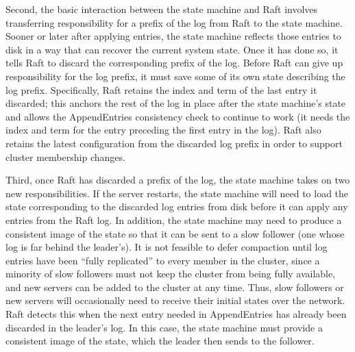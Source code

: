 Second, the basic interaction between the state machine and Raft
involves transferring responsibility for a prefix of the log from Raft
to the state machine.
Sooner or later after applying entries, the state machine reflects those
entries to disk in a way that can recover the current system state.
Once it has done so, it tells Raft to discard the corresponding
prefix of the log. 
Before Raft can give up responsibility for the log prefix,
it must save some of its own state describing the log prefix.
Specifically, Raft retains the index and term of the last entry it
discarded; this anchors the rest of the log in place after the state
machine's state and allows the AppendEntries consistency check to
continue to work (it needs the index and term for the entry preceding
the first entry in the log). Raft also retains the latest configuration
from the discarded log prefix in order to support cluster membership
changes.

Third, once Raft has discarded a prefix of the log, the state machine
takes on two new responsibilities. If the server restarts, the state
machine will need to load the state corresponding to the discarded log
entries from disk before it can apply any entries from the Raft log.
In addition, the state machine may need to produce a consistent image of
the state so that it can be sent to a slow follower
(one whose log is far behind the leader's). It is not feasible
to defer compaction  until log entries have been ``fully replicated'' to
every member in the cluster, since a minority of slow followers must not
keep the cluster from being fully available, and new servers can be
added to the cluster at any time. Thus, slow followers or new servers
will occasionally need to receive their initial states over the network.
Raft detects this when the next entry needed in AppendEntries has
already been discarded in the leader's log. In this case, the state
machine must provide a consistent image of the state, which the leader
then sends to the follower.


